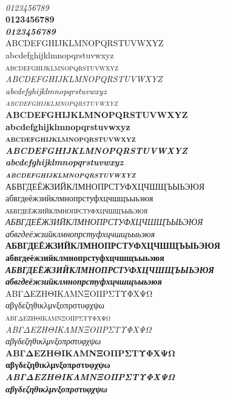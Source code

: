 \documentclass[10pt]{lecturenotes}
\begin{document}
\begin{sloppypar}
\begin{figure}[ht]
\begin{minipage}[b]{0.45\linewidth}
\\
\textit{0123456789}\\
\textbf{0123456789}\\
\textbf{\textit{0123456789}}\\

\noindent
ABCDEFGHIJKLMNOPQRSTUVWXYZ\\
abcdefghijklmnopqrstuvwxyz\\
\textsc{abcdefghijklmnopqrstuvwxyz}\\
\textit{ABCDEFGHIJKLMNOPQRSTUVWXYZ\\
abcdefghijklmnopqrstuvwxyz\\
\textsc{abcdefghijklmnopqrstuvwxyz}}\\
\textbf{ABCDEFGHIJKLMNOPQRSTUVWXYZ\\
abcdefghijklmnopqrstuvwxyz\\
\textsc{abcdefghijklmnopqrstuvwxyz}}\\
\textbf{\textit{ABCDEFGHIJKLMNOPQRSTUVWXYZ\\
abcdefghijklmnopqrstuvwxyz\\
\textsc{abcdefghijklmnopqrstuvwxyz}}}\\

\noindent
АБВГДЕЁЖЗИЙКЛМНОПРСТУФХЦЧШЩЪЫЬЭЮЯ \\
абвгдеёжзийклмнопрстуфхцчшщъыьэюя \\
\textsc{абвгдеёжзийклмнопрстуфхцчшщъыьэюя}\\
\textit{АБВГДЕЁЖЗИЙКЛМНОПРСТУФХЦЧШЩЪЫЬЭЮЯ\\
абвгдеёжзийклмнопрстуфхцчшщъыьэюя }\\
\textbf{АБВГДЕЁЖЗИЙКЛМНОПРСТУФХЦЧШЩЪЫЬЭЮЯ \\
абвгдеёжзийклмнопрстуфхцчшщъыьэюя }\\
\textbf{\textit{АБВГДЕЁЖЗИЙКЛМНОПРСТУФХЦЧШЩЪЫЬЭЮЯ \\
абвгдеёжзийклмнопрстуфхцчшщъыьэюя }}\\


\noindent
ΑΒΓΔΕΖΗΘΙΚΛΜΝΞΟΠΡΣΤΥΦΧΨΩ\\
αβγδεζηθικλμνξοπρστυφχψω\\
\textsc{αβγδεζηθικλμνξοπρστυφχψω}\\
\textit{ΑΒΓΔΕΖΗΘΙΚΛΜΝΞΟΠΡΣΤΥΦΧΨΩ\\
αβγδεζηθικλμνξοπρστυφχψω \\}
\textbf{ΑΒΓΔΕΖΗΘΙΚΛΜΝΞΟΠΡΣΤΥΦΧΨΩ\\
αβγδεζηθικλμνξοπρστυφχψω}\\
\textbf{\textit{ΑΒΓΔΕΖΗΘΙΚΛΜΝΞΟΠΡΣΤΥΦΧΨΩ\\
αβγδεζηθικλμνξοπρστυφχψω}}\\


\end{minipage}
\end{figure}
\end{sloppypar}
\end{document}
